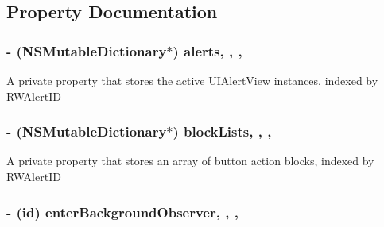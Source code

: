 \subsection{Property Documentation}
\hypertarget{category_f_m_s_alert_manager_07_08_a8342b7dcca068a831fb86301e1ac4cb6}{
\subsubsection[{alerts}]{\setlength{\rightskip}{0pt plus 5cm}-\/ (N\-S\-Mutable\-Dictionary$\ast$) alerts\hspace{0.3cm}{\ttfamily [read]}, {\ttfamily [write]}, {\ttfamily [nonatomic]}, {\ttfamily [strong]}}}\label{category_f_m_s_alert_manager_07_08_a8342b7dcca068a831fb86301e1ac4cb6}
A private property that stores the active U\-I\-Alert\-View instances, indexed by R\-W\-Alert\-I\-D \hypertarget{category_f_m_s_alert_manager_07_08_a559003e1dca7a6551e8986fed1c2b8ee}{
\subsubsection[{block\-Lists}]{\setlength{\rightskip}{0pt plus 5cm}-\/ (N\-S\-Mutable\-Dictionary$\ast$) block\-Lists\hspace{0.3cm}{\ttfamily [read]}, {\ttfamily [write]}, {\ttfamily [nonatomic]}, {\ttfamily [strong]}}}\label{category_f_m_s_alert_manager_07_08_a559003e1dca7a6551e8986fed1c2b8ee}
A private property that stores an array of button action blocks, indexed by R\-W\-Alert\-I\-D \hypertarget{category_f_m_s_alert_manager_07_08_af04f39bb5a6a173b5bb978b3ede6b50b}{
\subsubsection[{enter\-Background\-Observer}]{\setlength{\rightskip}{0pt plus 5cm}-\/ (id) enter\-Background\-Observer\hspace{0.3cm}{\ttfamily [read]}, {\ttfamily [write]}, {\ttfamily [nonatomic]}, {\ttfamily [strong]}}}\label{category_f_m_s_alert_manager_07_08_af04f39bb5a6a173b5bb978b3ede6b50b}
